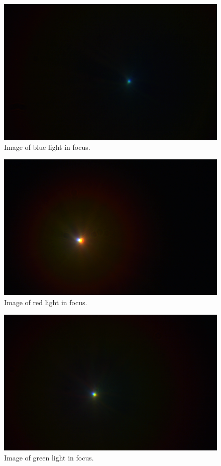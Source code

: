 \documentclass{emulateapj}
\begin{document}
\begin{figure}[H]
\centering
\includegraphics[scale=0.2]{blatt.png}
\caption{Image of blue light in focus.}
\label{img:blue}
\end{figure}
\begin{figure}[H]
\centering
\includegraphics[scale=0.2]{rod_fokus.png}
\caption{Image of red light in focus.}
\label{img:red}
\end{figure}

\begin{figure}[H]
\centering
\includegraphics[scale=0.2]{gront_fokus.png}
\caption{Image of green light in focus.}
\label{img:green}
\end{figure}
\end{document}
